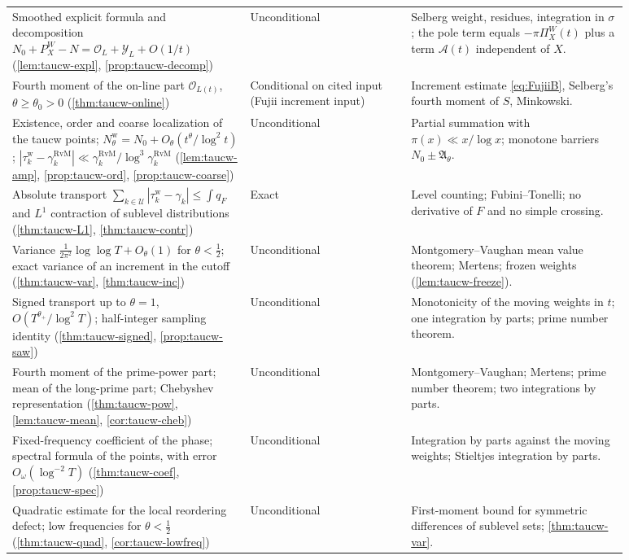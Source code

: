 \documentclass[11pt,a4paper]{article}
\numberwithin{equation}{section}
\theoremstyle{definition}
\theoremstyle{remark}
\begin{document}
\begin{longtable}{@{}p{0.34\linewidth}>{\raggedright\arraybackslash}p{0.23\linewidth}p{0.31\linewidth}@{}}
Smoothed explicit formula and decomposition $N_0+P_X^W-N=\mathcal O_L+\mathcal Y_L+O(1/t)$ (\cref{lem:taucw-expl}, \cref{prop:taucw-decomp}) & Unconditional & Selberg weight, residues, integration in $\sigma$; the pole term equals $-\pi\Pi_X^W(t)$ plus a term $\mathscr A(t)$ independent of $X$.\\
Fourth moment of the on-line part $\mathcal O_{L(t)}$, $\theta\ge\theta_0>0$ (\cref{thm:taucw-online}) & Conditional on cited input (Fujii increment input) & Increment estimate \eqref{eq:FujiiB}, Selberg\textquoteright s fourth moment of $S$, Minkowski.\\
Existence, order and coarse localization of the taucw points; $N^{\mathrm w}_\theta=N_0+O_\theta(t^\theta/\log^2t)$; $|\tau_k^{\mathrm w}-\gamma_k^{\mathrm{RvM}}|\ll\gamma_k^{\mathrm{RvM}}/\log^3\gamma_k^{\mathrm{RvM}}$ (\cref{lem:taucw-amp}, \cref{prop:taucw-ord}, \cref{prop:taucw-coarse}) & Unconditional & Partial summation with $\pi(x)\ll x/\log x$; monotone barriers $N_0\pm\mathfrak A_\theta$.\\
Absolute transport $\sum_{k\in\mathcal U}|\tau_k^{\mathrm w}-\gamma_k|\le\int q_F$ and $L^1$ contraction of sublevel distributions (\cref{thm:taucw-L1}, \cref{thm:taucw-contr}) & Exact & Level counting; Fubini--Tonelli; no derivative of $F$ and no simple crossing.\\
Variance $\frac1{2\pi^2}\log\log T+O_\theta(1)$ for $\theta<\frac12$; exact variance of an increment in the cutoff (\cref{thm:taucw-var}, \cref{thm:taucw-inc}) & Unconditional & Montgomery--Vaughan mean value theorem; Mertens; frozen weights (\cref{lem:taucw-freeze}).\\
Signed transport up to $\theta=1$, $O(T^{\theta_+}/\log^2T)$; half-integer sampling identity (\cref{thm:taucw-signed}, \cref{prop:taucw-saw}) & Unconditional & Monotonicity of the moving weights in $t$; one integration by parts; prime number theorem.\\
Fourth moment of the prime-power part; mean of the long-prime part; Chebyshev representation (\cref{thm:taucw-pow}, \cref{lem:taucw-mean}, \cref{cor:taucw-cheb}) & Unconditional & Montgomery--Vaughan; Mertens; prime number theorem; two integrations by parts.\\
Fixed-frequency coefficient of the phase; spectral formula of the points, with error $O_\omega(\log^{-2}T)$ (\cref{thm:taucw-coef}, \cref{prop:taucw-spec}) & Unconditional & Integration by parts against the moving weights; Stieltjes integration by parts.\\
Quadratic estimate for the local reordering defect; low frequencies for $\theta<\frac12$ (\cref{thm:taucw-quad}, \cref{cor:taucw-lowfreq}) & Unconditional & First-moment bound for symmetric differences of sublevel sets; \cref{thm:taucw-var}.\\

\end{longtable}
\end{document}
